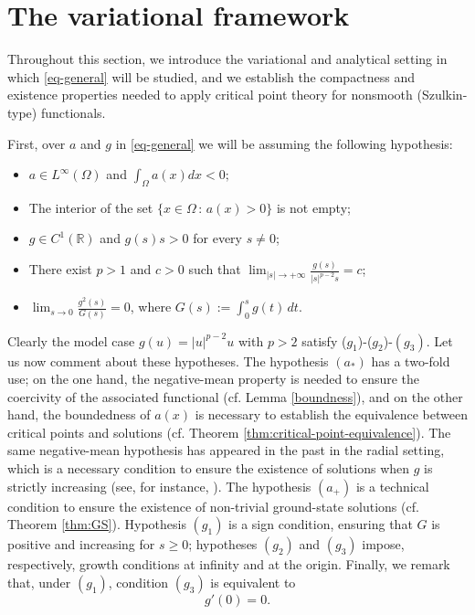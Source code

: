 \documentclass[11pt,reqno]{amsart}
\theoremstyle{plain}
\theoremstyle{definition}
\numberwithin{equation}{section}
\newcommand{\R}{\mathbb{R}}
\begin{document}
\section{The variational framework}\label{sec2}
Throughout this section, we introduce the variational and analytical setting in which \eqref{eq-general} will be studied, and we establish the compactness and existence properties needed to apply critical point theory for nonsmooth (Szulkin-type) functionals.


First, over $a$ and $g$ in \eqref{eq-general} we will be assuming the following hypothesis: 
\begin{itemize}
    \item[$(a_*)$] $a \in L^\infty(\Omega)$ and $\int_\Omega a(x) dx < 0;$  
    \item[$(a_+)$] The interior of the set $\{x \in \Omega \, \colon \, a(x) > 0 \}$ is not empty;
    \item[$(g_1)$] $g \in C^1(\R)$ and $g(s) s > 0$ for every $s \not = 0$;
    \item[$(g_2)$] There exist $p>1$ and $c>0$ such that $\lim_{|s|\to+\infty}
\frac{g(s)}{|s|^{p-2}s}=c$;

    \item[$(g_3)$] $ \lim_{s \to 0} \frac{g^2(s)}{G(s)} = 0$, where $G(s) := \int_0^s g(t) \, dt$.
\end{itemize}
Clearly the model case $g(u) = |u|^{p-2}u $ with $p>2$ satisfy ($g_1$)-($g_2$)-$(g_3)$.
Let us now comment about these hypotheses.
The hypothesis $(a_*)$ has a two-fold use; on the one hand, the negative-mean property is needed to ensure the coercivity of the associated functional (cf. Lemma \ref{boundness}), and on the other hand, the boundedness of $a(x)$ is necessary to establish the equivalence between critical points and solutions (cf. Theorem \ref{thm:critical-point-equivalence}). The same negative-mean hypothesis has appeared in the past in the radial setting, which is a necessary condition to ensure the existence of solutions when $g$ is strictly increasing (see, for instance, \cite{BoFe20}). The hypothesis $(a_+)$ is a technical condition to ensure the existence of non-trivial ground-state solutions (cf. Theorem \ref{thm:GS}). Hypothesis $(g_1)$ is a sign condition, ensuring that $G$ is positive and increasing for $s \geq 0$; hypotheses $(g_2)$ and $(g_3)$ impose, respectively, growth conditions at infinity and at the origin. Finally, we remark that, under $(g_1)$, condition $(g_3)$ is equivalent to 
$$g'(0)=0.$$
\end{document}
